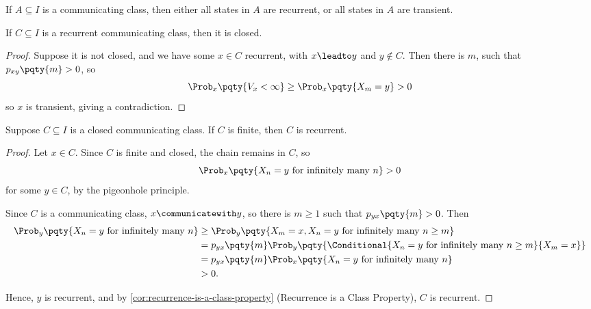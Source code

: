 \begin{corollary}
    \label{cor:recurrence-is-a-class-property}%
    If \(A \subseteq I\) is a communicating class, then either all states in \(A\) are recurrent, or all states in \(A\) are transient.
\end{corollary}

\begin{theorem}
    If \(C \subseteq I\) is a recurrent communicating class, then it is closed.
\end{theorem}

\begin{proof}
    Suppose it is not closed, and we have some \(x \in C\) recurrent, with \(x \leadto y\) and \(y \notin C\). Then there is \(m\), such that \(p_{xy} \pqty{m} > 0\), so
    \[
        \Prob_x \pqty{V_x < \infty} \geq \Prob_x \pqty{X_m = y} > 0
    \]
    so \(x\) is transient, giving a contradiction.
\end{proof}

\begin{theorem}
    Suppose \(C \subseteq I\) is a closed communicating class. If \(C\) is finite, then \(C\) is recurrent.
\end{theorem}

\begin{proof}
    Let \(x \in C\). Since \(C\) is finite and closed, the chain remains in \(C\), so
    \[
        \Prob_x \pqty{X_n = y \text{ for infinitely many } n} > 0
    \]
    for some \(y \in C\), by the pigeonhole principle.

    Since \(C\) is a communicating class, \(x \communicatewith y\), so there is \(m \geq 1\) such that \(p_{yx} \pqty{m} > 0\). Then
    \begin{align*}
        \Prob_y \pqty{X_n = y \text{ for infinitely many } n} &\geq \Prob_y \pqty{X_m = x, X_{n} = y \text{ for infinitely many } n \geq m} \\
        &= p_{yx} \pqty{m} \Prob_y \pqty{\Conditional{X_n = y \text{ for infinitely many } n \geq m}{X_m = x}} \\
        &= p_{yx} \pqty{m} \Prob_x \pqty{X_n = y \text{ for infinitely many } n} \\
        &> 0.
    \end{align*}

    Hence, \(y\) is recurrent, and by \autoref{cor:recurrence-is-a-class-property} (Recurrence is a Class Property), \(C\) is recurrent.
\end{proof}

